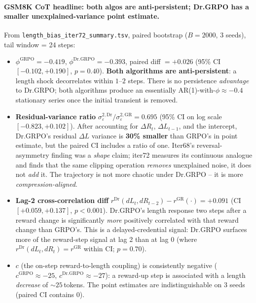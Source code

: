 \documentclass{article}
\begin{document}
\paragraph{GSM8K CoT headline: both algos are anti-persistent; Dr.GRPO has a smaller unexplained-variance point estimate.}
From \texttt{length\_bias\_iter72\_summary.tsv}, paired bootstrap
($B = 2000$, 3 seeds), tail window = 24 steps:
\begin{itemize}
\item $\phi^{\mathrm{GRPO}} = -0.419$, $\phi^{\mathrm{Dr.GRPO}} = -0.393$,
      paired diff $= +0.026$ (95\% CI $[-0.102, +0.190]$, $p = 0.40$).
      \textbf{Both algorithms are anti-persistent}: a length shock
      decorrelates within $1$--$2$ steps. There is no persistence
      \emph{advantage} to Dr.GRPO; both algorithms produce an
      essentially AR(1)-with-$\phi \approx -0.4$ stationary series once
      the initial transient is removed.
\item \textbf{Residual-variance ratio} $\sigma^{2,\mathrm{Dr}}_\varepsilon /
      \sigma^{2,\mathrm{GR}}_\varepsilon = 0.695$ (95\% CI on log scale
      $[-0.823, +0.102]$).
      After accounting for $\Delta R_t$, $\Delta L_{t-1}$, and the
      intercept, Dr.GRPO's residual $\Delta L$ variance is
      \textbf{30\% smaller} than GRPO's in point estimate, but the paired
      CI includes a ratio of one. Iter68's reversal-asymmetry
      finding was a \emph{shape} claim; iter72 measures its
      continuous analogue and finds that the same clipping operation
      \emph{removes} unexplained noise, it does not \emph{add} it. The
      trajectory is not more chaotic under Dr.GRPO -- it is more
      \emph{compression-aligned}.
\item \textbf{Lag-2 cross-correlation diff} $r^{\mathrm{Dr}}(dL_t,
      dR_{t-2}) - r^{\mathrm{GR}}(\cdot) = +0.091$ (CI $[+0.059,
      +0.137]$, $p < 0.001$). Dr.GRPO's length response two steps after
      a reward change is significantly \emph{more} positively correlated
      with that reward change than GRPO's. This is a delayed-credential
      signal: Dr.GRPO surfaces more of the reward-step signal at lag 2
      than at lag 0 (where $r^{\mathrm{Dr}}(dL_t, dR_t) = r^{\mathrm{GR}}$
      within CI; $p = 0.70$).
\item $c$ (the on-step reward-to-length coupling) is consistently
      negative ($c^{\mathrm{GRPO}} \approx -25$, $c^{\mathrm{Dr.GRPO}}
      \approx -27$): a reward-up step is associated with a length
      \emph{decrease} of $\sim 25$\,tokens. The point estimates are
      indistinguishable on 3 seeds (paired CI contains 0).
\end{itemize}
\end{document}
